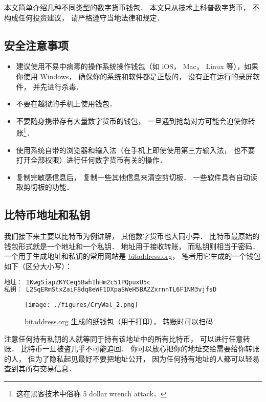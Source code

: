 
本文简单介绍几种不同类型的数字货币钱包． 本文只从技术上科普数字货币， 不构成任何投资建议， 请严格遵守当地法律和规定．

\subsection{安全注意事项}
\begin{itemize}
\item 建议使用不易中病毒的操作系统操作钱包（如 iOS， Mac， Linux 等），如果你使用 Windows， 确保你的系统和软件都是正版的， 没有正在运行的录屏软件， 并先进行杀毒．
\item 不要在越狱的手机上使用钱包．
\item 不要随身携带存有大量数字货币的钱包， 一旦遇到抢劫对方可能会迫使你转账\footnote{这在黑客技术中俗称 5 dollar wrench attack．}．
\item 使用系统自带的浏览器和输入法（在手机上即使使用第三方输入法， 也不要打开全部权限）进行任何数字货币有关的操作．
\item 复制完敏感信息后， 复制一些其他信息来清空剪切板． 一些软件具有自动读取剪切板的功能．
\end{itemize}

\subsection{比特币地址和私钥}
我们接下来主要以比特币为例讲解， 其他数字货币也大同小异． 比特币最原始的钱包形式就是一个地址和一个私钥． 地址用于接收转账， 而私钥则相当于密码． 一个用于生成地址和私钥的常用网站是 \href{https://www.bitaddress.org/}{bitaddress.org}， 笔者用它生成的一个钱包如下（区分大小写）：
\begin{lstlisting}[language=bash]
地址： 1KwgSiapZKYCeq5Bwh1hHm2c51PQpuxU5c
私钥： L2SqERmStxZaiF8dq8eWF1DXpaSWeH5BAZZxrnnTL6F1NM3vjfsD
\end{lstlisting}

\begin{figure}[ht]
\centering
\texttt{[image: ./figures/CryWal\_2.png]}
\caption{\href{https://www.bitaddress.org/}{bitaddress.org} 生成的纸钱包（用于打印）， 转账时可以扫码} \label{CryWal_fig2}
\end{figure}

注意任何持有私钥的人就等同于持有该地址中的所有比特币， 可以进行任意转账． 比特币一旦被盗几乎不可能追回． 你可以放心把你的地址交给需要给你转账的人， 但为了隐私起见最好不要把地址公开， 因为任何持有地址的人都可以轻易查到其所有交易信息．

